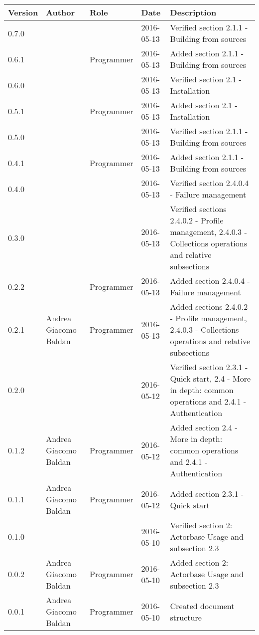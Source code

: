 \documentclass{scalatekids-article}
\begin{document}
\begin{center}
  \begin{tabular}{| l | l | l | l | p{5cm} |}
    \hline
    Version & Author & Role & Date & Description \\
    \hline
    0.7.0 & & & 2016-05-13 & Verified section 2.1.1 - Building from sources\\
    \hline
    0.6.1 & & Programmer & 2016-05-13 & Added section 2.1.1 - Building from sources\\
    \hline
    0.6.0 & & & 2016-05-13 & Verified section 2.1 - Installation\\
    \hline
    0.5.1 & & Programmer & 2016-05-13 & Added section 2.1 - Installation\\
    \hline
    0.5.0 & & & 2016-05-13 & Verified section 2.1.1 - Building from sources\\
    \hline
    0.4.1 & & Programmer & 2016-05-13 & Added section 2.1.1 - Building from sources\\
    \hline
    0.4.0 & & & 2016-05-13 & Verified section 2.4.0.4 - Failure management\\
    \hline
    0.3.0 & & & 2016-05-13 & Verified sections 2.4.0.2 - Profile management, 2.4.0.3 - Collections operations and relative subsections\\
    \hline
    0.2.2 & & Programmer & 2016-05-13 & Added section 2.4.0.4 - Failure management\\
    \hline
    0.2.1 & Andrea Giacomo Baldan & Programmer & 2016-05-13 & Added sections 2.4.0.2 - Profile management, 2.4.0.3 - Collections operations and relative subsections\\
    \hline
    0.2.0 &  &  & 2016-05-12 & Verified section 2.3.1 - Quick start, 2.4 - More in depth: common operations and 2.4.1 - Authentication\\
    \hline
    0.1.2 & Andrea Giacomo Baldan & Programmer & 2016-05-12 & Added section 2.4 - More in depth: common operations and 2.4.1 - Authentication\\
    \hline
    0.1.1 & Andrea Giacomo Baldan & Programmer & 2016-05-12 & Added section 2.3.1 - Quick start\\
    \hline
    0.1.0 &  &  & 2016-05-10 & Verified section 2: Actorbase Usage and subsection 2.3\\
    \hline
    0.0.2 & Andrea Giacomo Baldan & Programmer & 2016-05-10 & Added section 2: Actorbase Usage and subsection 2.3\\
    \hline
    0.0.1 & Andrea Giacomo Baldan & Programmer & 2016-05-10 & Created document structure\\
    \hline
  \end{tabular}
\end{center}
\tableofcontents
\newpage
{}
\end{document}
